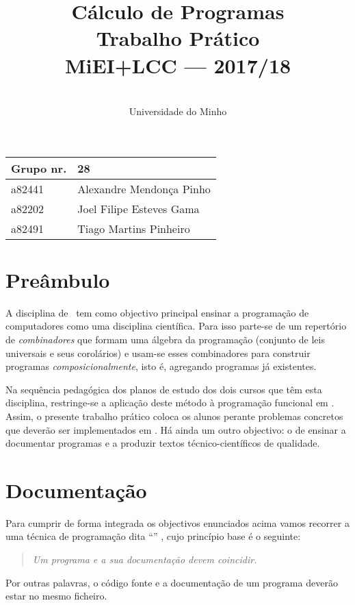 \documentclass[a4paper]{article}
\title{
       	    Cálculo de Programas
\\
       	Trabalho Prático
\\
       	MiEI+LCC --- 2017/18
}
\author{
       	\dium
\\
       	Universidade do Minho
}
\date\mydate
\begin{document}
\maketitle

\begin{center}\large
\begin{tabular}{ll}
\textbf{Grupo} nr. & 28
\\\hline
a82441 & Alexandre Mendonça Pinho
\\
a82202 & Joel Filipe Esteves Gama
\\
a82491 & Tiago Martins Pinheiro
\end{tabular}
\end{center}

\section{Preâmbulo}

A disciplina de \CP\ tem como objectivo principal ensinar
a progra\-mação de computadores como uma disciplina científica. Para isso
parte-se de um repertório de \emph{combinadores} que formam uma álgebra da
programação (conjunto de leis universais e seus corolários) e usam-se esses
combinadores para construir programas \emph{composicionalmente}, isto é,
agregando programas já existentes.
  
Na sequência pedagógica dos planos de estudo dos dois cursos que têm esta
disciplina, restringe-se a aplicação deste método à programação funcional
em \Haskell. Assim, 
o presente trabalho prático coloca os alunos perante problemas
concretos que deverão ser implementados em \Haskell.
Há ainda um outro objectivo: o de ensinar a documentar programas e
a produzir textos técnico-científicos de qualidade.

\section{Documentação}
Para cumprir de forma integrada os objectivos enunciados acima vamos recorrer
a uma técnica de programa\-ção dita ``'' \cite{Kn92}, cujo
princípio base é o seguinte:
\begin{quote}\em
Um programa e a sua documentação devem coincidir.
\end{quote}
Por outras palavras, o código fonte e a documentação de um programa deverão estar no
mesmo ficheiro.
\end{document}
